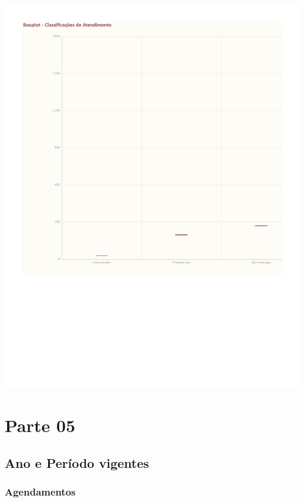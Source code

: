 \documentclass[
  letterpaper,
  DIV=11,
  numbers=noendperiod]{scrreprt}
\begin{document}
\includegraphics{2022_files/figure-pdf/unnamed-chunk-9-1.pdf}

\part{Parte 05}

\hypertarget{ano-e-peruxedodo-vigentes-1}{%
\chapter*{Ano e Período vigentes}\label{ano-e-peruxedodo-vigentes-1}}


\hypertarget{agendamentos-4}{%
\section*{Agendamentos}\label{agendamentos-4}}
\end{document}
